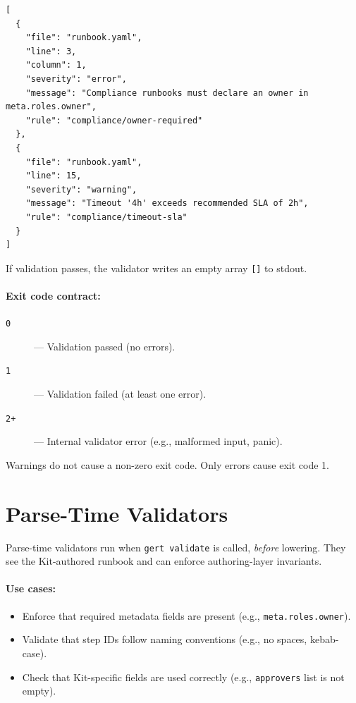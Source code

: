 \begin{verbatim}
[
  {
    "file": "runbook.yaml",
    "line": 3,
    "column": 1,
    "severity": "error",
    "message": "Compliance runbooks must declare an owner in meta.roles.owner",
    "rule": "compliance/owner-required"
  },
  {
    "file": "runbook.yaml",
    "line": 15,
    "severity": "warning",
    "message": "Timeout '4h' exceeds recommended SLA of 2h",
    "rule": "compliance/timeout-sla"
  }
]
\end{verbatim}

If validation passes, the validator writes an empty array \texttt{[]} to stdout.

\paragraph{Exit code contract:}

\begin{description}
  \item[\texttt{0}] --- Validation passed (no errors).
  \item[\texttt{1}] --- Validation failed (at least one error).
  \item[\texttt{2+}] --- Internal validator error (e.g., malformed input, panic).
\end{description}

Warnings do not cause a non-zero exit code. Only errors cause exit code 1.

\section{Parse-Time Validators}
\label{sec:parse-validators}

Parse-time validators run when \texttt{gert validate} is called, \emph{before}
lowering. They see the Kit-authored runbook and can enforce authoring-layer
invariants.

\paragraph{Use cases:}

\begin{itemize}
  \item Enforce that required metadata fields are present (e.g.,
    \texttt{meta.roles.owner}).
  \item Validate that step IDs follow naming conventions (e.g., no spaces,
    kebab-case).
  \item Check that Kit-specific fields are used correctly (e.g.,
    \texttt{approvers} list is not empty).
\end{itemize}


